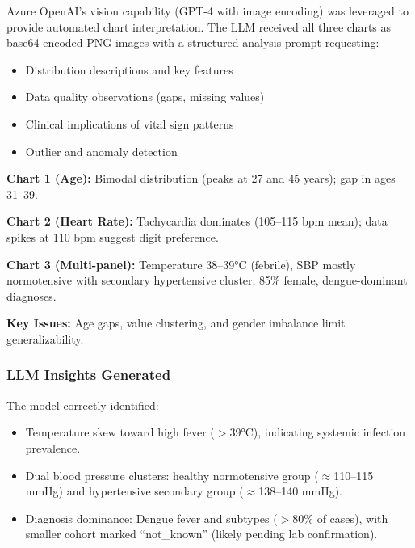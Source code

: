 \documentclass[10pt,a4paper]{article}
\begin{document}
Azure OpenAI's vision capability (GPT-4 with image encoding) was leveraged to provide automated chart interpretation. The LLM received all three charts as base64-encoded PNG images with a structured analysis prompt requesting:

\begin{itemize}
    \item Distribution descriptions and key features
    \item Data quality observations (gaps, missing values)
    \item Clinical implications of vital sign patterns
    \item Outlier and anomaly detection
\end{itemize}

\vspace{0.3cm}

\begin{tcolorbox}[colback=gray!5!white, colframe=gray!50!black, title=\textbf{LLM Chart Analysis Summary}, fonttitle=\bfseries\small, boxrule=0.5pt, arc=2mm, left=3mm, right=3mm, top=2mm, bottom=2mm]
\small
\textbf{Chart 1 (Age):} Bimodal distribution (peaks at 27 and 45 years); gap in ages 31--39.

\textbf{Chart 2 (Heart Rate):} Tachycardia dominates (105--115 bpm mean); data spikes at 110 bpm suggest digit preference.

\textbf{Chart 3 (Multi-panel):} Temperature 38--39°C (febrile), SBP mostly normotensive with secondary hypertensive cluster, 85\% female, dengue-dominant diagnoses.

\textbf{Key Issues:} Age gaps, value clustering, and gender imbalance limit generalizability.
\end{tcolorbox}

\subsubsection{LLM Insights Generated}

The model correctly identified:
\begin{itemize}
    \item Temperature skew toward high fever ($>$39°C), indicating systemic infection prevalence.
    \item Dual blood pressure clusters: healthy normotensive group ($\approx$110--115 mmHg) and hypertensive secondary group ($\approx$138--140 mmHg).
    \item Diagnosis dominance: Dengue fever and subtypes ($>$80\% of cases), with smaller cohort marked ``not\_known'' (likely pending lab confirmation).
\end{itemize}
\end{document}
